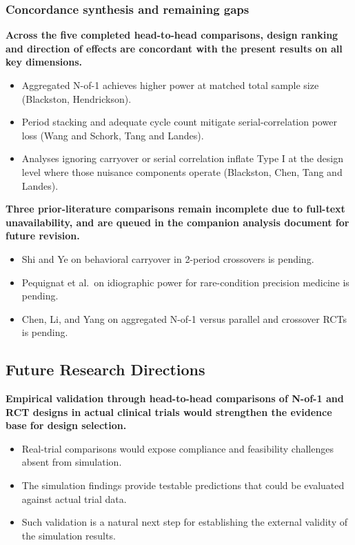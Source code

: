 \documentclass[
  11pt,
]{article}
\begin{document}
\subsubsection{Concordance synthesis and remaining gaps}\label{concordance-synthesis-and-remaining-gaps}

\textbf{Across the five completed head-to-head comparisons, design ranking and direction of effects are concordant with the present results on all key dimensions.}

\begin{itemize}\setlength{\itemsep}{2pt}\setlength{\parskip}{0pt}
\item Aggregated N-of-1 achieves higher power at matched total sample size (Blackston, Hendrickson).
\item Period stacking and adequate cycle count mitigate serial-correlation power loss (Wang and Schork, Tang and Landes).
\item Analyses ignoring carryover or serial correlation inflate Type I at the design level where those nuisance components operate (Blackston, Chen, Tang and Landes).
\end{itemize}

\textbf{Three prior-literature comparisons remain incomplete due to full-text unavailability, and are queued in the companion analysis document for future revision.}

\begin{itemize}\setlength{\itemsep}{2pt}\setlength{\parskip}{0pt}
\item Shi and Ye on behavioral carryover in 2-period crossovers is pending.
\item Pequignat et al.\ on idiographic power for rare-condition precision medicine is pending.
\item Chen, Li, and Yang on aggregated N-of-1 versus parallel and crossover RCTs is pending.
\end{itemize}

\subsection{Future Research Directions}\label{future-research-directions}

\textbf{Empirical validation through head-to-head comparisons of N-of-1 and RCT designs in actual clinical trials would strengthen the evidence base for design selection.}

\begin{itemize}\setlength{\itemsep}{2pt}\setlength{\parskip}{0pt}
\item Real-trial comparisons would expose compliance and feasibility challenges absent from simulation.
\item The simulation findings provide testable predictions that could be evaluated against actual trial data.
\item Such validation is a natural next step for establishing the external validity of the simulation results.
\end{itemize}
\end{document}
